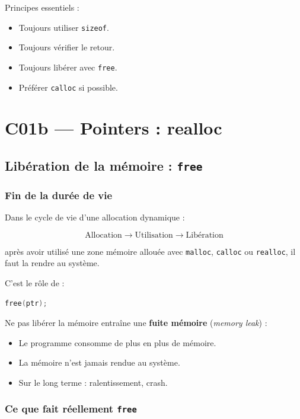 Principes essentiels :

\begin{itemize}
    \item Toujours utiliser \texttt{sizeof}.
    \item Toujours vérifier le retour.
    \item Toujours libérer avec \texttt{free}.
    \item Préférer \texttt{calloc} si possible.
\end{itemize}


\section{C01b — Pointers : realloc}

\subsection{Libération de la mémoire : \texttt{free}}

\subsubsection{Fin de la durée de vie}

Dans le cycle de vie d’une allocation dynamique :

\[
\text{Allocation} \longrightarrow \text{Utilisation} \longrightarrow \text{Libération}
\]

après avoir utilisé une zone mémoire allouée avec
\texttt{malloc}, \texttt{calloc} ou \texttt{realloc},
il faut la rendre au système.

C’est le rôle de :

\begin{lstlisting}[language=C]
free(ptr);
\end{lstlisting}

Ne pas libérer la mémoire entraîne une \textbf{fuite mémoire}
(\textit{memory leak}) :

\begin{itemize}
    \item Le programme consomme de plus en plus de mémoire.
    \item La mémoire n’est jamais rendue au système.
    \item Sur le long terme : ralentissement, crash.
\end{itemize}

\subsubsection{Ce que fait réellement \texttt{free}}

